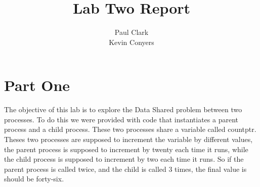 \documentclass[12pt, titlepage]{article}
\title{Lab Two Report}
\author{Paul Clark \\ Kevin Conyers}
\begin{document}
\maketitle{}
\section*{Part One}
\par{} 
The objective of this lab is to explore the Data Shared problem between two processes.
To do this we were provided with code that instantiates a parent process and a child process.
These two processes share a variable called countptr. 
Theses two processes are supposed to increment the variable by different values,
the parent process is supposed to increment by twenty each time it runs, while the child
process is supposed to increment by two each time it runs.
So if the parent process is called twice, and the child is called 3 times, the final value is should be forty-six.
\end{document}
